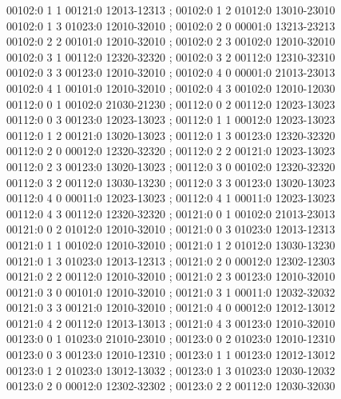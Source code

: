 \documentclass[11pt]{article}
\theoremstyle{remark}
\numberwithin{equation}{section}
\numberwithin{table}{section}
\begin{document}
\begin{flushleft}
00102:0 1 1 00121:0 12013-12313 ; 00102:0 1 2 01012:0 13010-23010\\
00102:0 1 3 01023:0 12010-32010 ; 00102:0 2 0 00001:0 13213-23213\\
00102:0 2 2 00101:0 12010-32010 ; 00102:0 2 3 00102:0 12010-32010\\
00102:0 3 1 00112:0 12320-32320 ; 00102:0 3 2 00112:0 12310-32310\\
00102:0 3 3 00123:0 12010-32010 ; 00102:0 4 0 00001:0 21013-23013\\
00102:0 4 1 00101:0 12010-32010 ; 00102:0 4 3 00102:0 12010-12030\\
00112:0 0 1 00102:0 21030-21230 ; 00112:0 0 2 00112:0 12023-13023\\
00112:0 0 3 00123:0 12023-13023 ; 00112:0 1 1 00012:0 12023-13023\\
00112:0 1 2 00121:0 13020-13023 ; 00112:0 1 3 00123:0 12320-32320\\
00112:0 2 0 00012:0 12320-32320 ; 00112:0 2 2 00121:0 12023-13023\\
00112:0 2 3 00123:0 13020-13023 ; 00112:0 3 0 00102:0 12320-32320\\
00112:0 3 2 00112:0 13030-13230 ; 00112:0 3 3 00123:0 13020-13023\\
00112:0 4 0 00011:0 12023-13023 ; 00112:0 4 1 00011:0 12023-13023\\
00112:0 4 3 00112:0 12320-32320 ; 00121:0 0 1 00102:0 21013-23013\\
00121:0 0 2 01012:0 12010-32010 ; 00121:0 0 3 01023:0 12013-12313\\
00121:0 1 1 00102:0 12010-32010 ; 00121:0 1 2 01012:0 13030-13230\\
00121:0 1 3 01023:0 12013-12313 ; 00121:0 2 0 00012:0 12302-12303\\
00121:0 2 2 00112:0 12010-32010 ; 00121:0 2 3 00123:0 12010-32010\\
00121:0 3 0 00101:0 12010-32010 ; 00121:0 3 1 00011:0 12032-32032\\
00121:0 3 3 00121:0 12010-32010 ; 00121:0 4 0 00012:0 12012-13012\\
00121:0 4 2 00112:0 12013-13013 ; 00121:0 4 3 00123:0 12010-32010\\
00123:0 0 1 01023:0 21010-23010 ; 00123:0 0 2 01023:0 12010-12310\\
00123:0 0 3 00123:0 12010-12310 ; 00123:0 1 1 00123:0 12012-13012\\
00123:0 1 2 01023:0 13012-13032 ; 00123:0 1 3 01023:0 12030-12032\\
00123:0 2 0 00012:0 12302-32302 ; 00123:0 2 2 00112:0 12030-32030\\

\end{flushleft}
\end{document}
